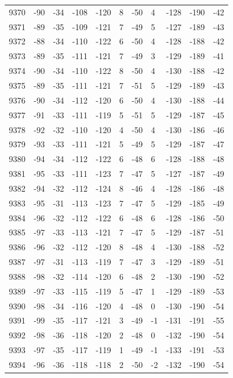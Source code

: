 \begin{table}[H]
\begin{tabular}{lllllllllll}
9370 & -90 & -34 & -108 & -120 & 8 & -50 & 4 & -128 & -190 & -42 \\
9371 & -89 & -35 & -109 & -121 & 7 & -49 & 5 & -127 & -189 & -43 \\
9372 & -88 & -34 & -110 & -122 & 6 & -50 & 4 & -128 & -188 & -42 \\
9373 & -89 & -35 & -111 & -121 & 7 & -49 & 3 & -129 & -189 & -41 \\
9374 & -90 & -34 & -110 & -122 & 8 & -50 & 4 & -130 & -188 & -42 \\
9375 & -89 & -35 & -111 & -121 & 7 & -51 & 5 & -129 & -189 & -43 \\
9376 & -90 & -34 & -112 & -120 & 6 & -50 & 4 & -130 & -188 & -44 \\
9377 & -91 & -33 & -111 & -119 & 5 & -51 & 5 & -129 & -187 & -45 \\
9378 & -92 & -32 & -110 & -120 & 4 & -50 & 4 & -130 & -186 & -46 \\
9379 & -93 & -33 & -111 & -121 & 5 & -49 & 5 & -129 & -187 & -47 \\
9380 & -94 & -34 & -112 & -122 & 6 & -48 & 6 & -128 & -188 & -48 \\
9381 & -95 & -33 & -111 & -123 & 7 & -47 & 5 & -127 & -187 & -49 \\
9382 & -94 & -32 & -112 & -124 & 8 & -46 & 4 & -128 & -186 & -48 \\
9383 & -95 & -31 & -113 & -123 & 7 & -47 & 5 & -129 & -185 & -49 \\
9384 & -96 & -32 & -112 & -122 & 6 & -48 & 6 & -128 & -186 & -50 \\
9385 & -97 & -33 & -113 & -121 & 7 & -47 & 5 & -129 & -187 & -51 \\
9386 & -96 & -32 & -112 & -120 & 8 & -48 & 4 & -130 & -188 & -52 \\
9387 & -97 & -31 & -113 & -119 & 7 & -47 & 3 & -129 & -189 & -51 \\
9388 & -98 & -32 & -114 & -120 & 6 & -48 & 2 & -130 & -190 & -52 \\
9389 & -97 & -33 & -115 & -119 & 5 & -47 & 1 & -129 & -189 & -53 \\
9390 & -98 & -34 & -116 & -120 & 4 & -48 & 0 & -130 & -190 & -54 \\
9391 & -99 & -35 & -117 & -121 & 3 & -49 & -1 & -131 & -191 & -55 \\
9392 & -98 & -36 & -118 & -120 & 2 & -48 & 0 & -132 & -190 & -54 \\
9393 & -97 & -35 & -117 & -119 & 1 & -49 & -1 & -133 & -191 & -53 \\
9394 & -96 & -36 & -118 & -118 & 2 & -50 & -2 & -132 & -190 & -54 \\

\end{tabular}
\end{table}

